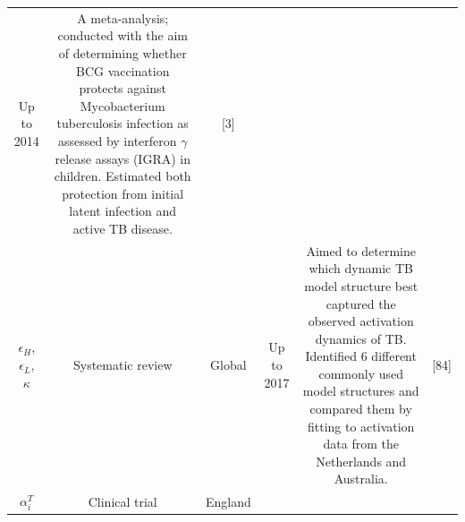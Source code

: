 \documentclass[11pt,twoside]{bristolthesis}
\begin{document}
\begin{longtable}[]{@{}cccccc@{}}
\begin{minipage}[t]{0.08\columnwidth}
  Up to
  2014\strut
  \end{minipage} & \begin{minipage}[t]{0.29\columnwidth}\centering
  A meta-analysis; conducted with the aim
  of determining whether BCG vaccination
  protects against Mycobacterium
  tuberculosis infection as assessed by
  interferon \(\gamma\) release assays
  (IGRA) in children. Estimated both
  protection from initial latent infection
  and active TB disease.\strut
  \end{minipage} & \begin{minipage}[t]{0.12\columnwidth}\centering
  {[}3{]}\strut
  \end{minipage}\tabularnewline
  \begin{minipage}[t]{0.16\columnwidth}\centering
  \(\epsilon_H\),
  \(\epsilon_L\),
  \(\kappa\)\strut
  \end{minipage} & \begin{minipage}[t]{0.11\columnwidth}\centering
  Systematic
  review\strut
  \end{minipage} & \begin{minipage}[t]{0.08\columnwidth}\centering
  Global\strut
  \end{minipage} & \begin{minipage}[t]{0.08\columnwidth}\centering
  Up to
  2017\strut
  \end{minipage} & \begin{minipage}[t]{0.29\columnwidth}\centering
  Aimed to determine which dynamic TB
  model structure best captured the
  observed activation dynamics of TB.
  Identified 6 different commonly used
  model structures and compared them by
  fitting to activation data from the
  Netherlands and Australia.\strut
  \end{minipage} & \begin{minipage}[t]{0.12\columnwidth}\centering
  {[}84{]}\strut
  \end{minipage}\tabularnewline
  \begin{minipage}[t]{0.16\columnwidth}\centering
  \(\alpha_i^T\)\strut
  \end{minipage} & \begin{minipage}[t]{0.11\columnwidth}\centering
  Clinical
  trial\strut
  \end{minipage} & \begin{minipage}[t]{0.08\columnwidth}\centering
  England\strut
  \end{minipage} & \begin{minipage}[t]{0.08\columnwidth}\centering

\end{minipage}
\end{longtable}
\end{document}
